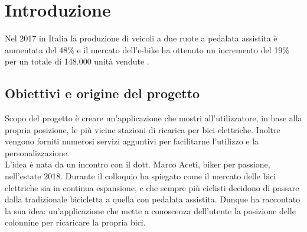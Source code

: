 
%

\chapter{Introduzione}
	Nel 2017 in Italia la produzione di veicoli a due ruote a pedalata assistita è aumentata
	del 48\% e il mercato dell'e-bike ha ottenuto un incremento del 
	19\%  per un totale di 148.000 unità vendute
	\cite{biciElettrica}.   
	\section{Obiettivi e origine del progetto}
	Scopo del progetto è creare un’applicazione che mostri all’utilizzatore, in
	base  alla propria posizione, le più vicine stazioni di ricarica per bici
	elettriche. Inoltre vengono forniti numerosi servizi agguntivi per
	facilitarne l'utilizzo e la personalizzazione.\\
	L'idea è nata da un incontro con il dott. Marco Aceti, biker per passione,
	nell'estate 2018. Durante il colloquio ha spiegato come il mercato delle
	bici elettriche sia in continua espansione, e che sempre più ciclisti
	decidono di passare dalla tradizionale bicicletta a quella con pedalata
	assistita. Dunque ha raccontato la sua idea: un'applicazione che mette a
	conoscenza dell'utente la posizione delle colonnine per ricaricare la
	propria bici.
	
